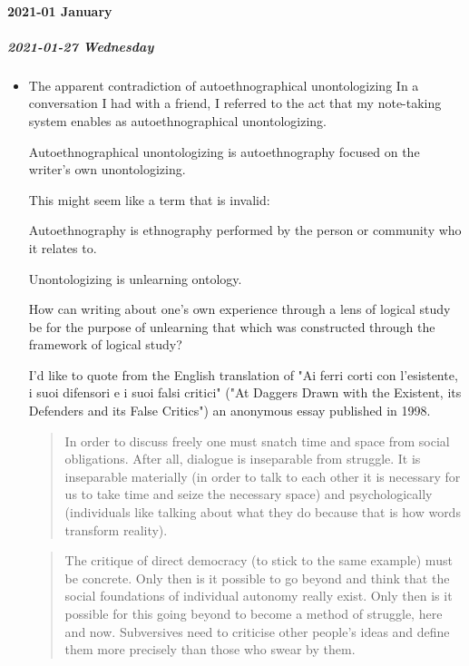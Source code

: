 \documentclass[11pt]{article}
\begin{document}
\paragraph*{2021-01 January}
\label{sec:org55f83d0}
\startcontents[level-4]
\subparagraph*{2021-01-27 Wednesday}
\label{sec:orgdede591}
\begin{itemize}
\item The apparent contradiction of autoethnographical unontologizing
\label{sec:org1cc9841}
In a conversation I had with a friend, I referred to the act that my note-taking system enables as autoethnographical unontologizing. 

Autoethnographical unontologizing is autoethnography focused on the writer's own unontologizing.

This might seem like a term that is invalid:

Autoethnography is ethnography performed by the person or community who it relates to.

Unontologizing is unlearning ontology.

How can writing about one's own experience through a lens of logical study be for the purpose of unlearning that which was constructed through the framework of logical study?

I'd like to quote from the English translation of "Ai ferri corti con l’esistente, i suoi difensori e i suoi falsi critici" ("At Daggers Drawn with the Existent, its Defenders and its False Critics") an anonymous essay published in 1998.

\begin{quote}
In order to discuss freely one must snatch time and space from social obligations. After all, dialogue is inseparable from struggle. It is inseparable materially (in order to talk to each other it is necessary for us to take time and seize the necessary space) and psychologically (individuals like talking about what they do because that is how words transform reality).
\end{quote}

\begin{quote}
The critique of direct democracy (to stick to the same example) must be concrete. Only then is it possible to go beyond and think that the social foundations of individual autonomy really exist. Only then is it possible for this going beyond to become a method of struggle, here and now. Subversives need to criticise other people’s ideas and define them more precisely than those who swear by them.
\end{quote}


\end{itemize}
\end{document}
